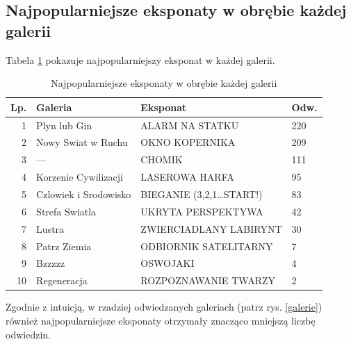 \documentclass[conference]{IEEEtran}
\begin{document}
\subsection{Najpopularniejsze eksponaty w obrębie każdej galerii}
Tabela \ref{top_eksponaty_galerie} pokazuje najpopularniejszy eksponat w każdej galerii.

\begin{table}[H]
\caption{Najpopularniejsze eksponaty w obrębie każdej galerii}
\label{top_eksponaty_galerie}
\centering
\begin{tabular}{|r|l|l|l|}
\hline
\textbf{Lp.} & \textbf{Galeria} & \textbf{Eksponat} & \textbf{Odw.} \\
\hline

1  &          Plyn lub Gin &           ALARM NA STATKU &  220  \\
2  &    Nowy Swiat w Ruchu &            OKNO KOPERNIKA &              209  \\
3  &                ---    &                    CHOMIK &              111  \\
4  &  Korzenie Cywilizacji &            LASEROWA HARFA &               95  \\
5  & Czlowiek i Srodowisko & BIEGANIE (3,2,1\ldots START!) &               83  \\
6  &        Strefa Swiatla &        UKRYTA PERSPEKTYWA &               42  \\
7  &                Lustra &    ZWIERCIADLANY LABIRYNT &               30  \\
8  &          Patrz Ziemia &     ODBIORNIK SATELITARNY &                7  \\
9  &                Bzzzzz &                  OSWOJAKI &                4  \\
10 &           Regeneracja &      ROZPOZNAWANIE TWARZY &                2  \\
\hline
\end{tabular}
\end{table}
Zgodnie z intuicją, w rzadziej odwiedzanych galeriach (patrz rys. \ref{galerie}) również najpopularniejsze eksponaty otrzymały znacząco mniejszą liczbę odwiedzin.
\end{document}
